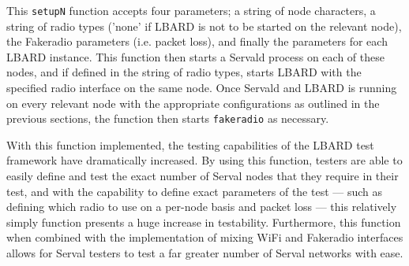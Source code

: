 This \verb|setupN| function accepts four parameters; a string of node characters, a string of radio types ('none' if LBARD is not to be started on the relevant node), the Fakeradio parameters (i.e. packet loss), and finally the parameters for each LBARD instance.
This function then starts a Servald process on each of these nodes, and if defined in the string of radio types, starts LBARD with the specified radio interface on the same node.
Once Servald and LBARD is running on every relevant node with the appropriate configurations as outlined in the previous sections, the function then starts \verb|fakeradio| as necessary.

With this function implemented, the testing capabilities of the LBARD test framework have dramatically increased.
By using this function, testers are able to easily define and test the exact number of Serval nodes that they require in their test, and with the capability to define exact parameters of the test — such as defining which radio to use on a per-node basis and packet loss — this relatively simply function presents a huge increase in testability.
Furthermore, this function when combined with the implementation of mixing WiFi and Fakeradio interfaces allows for Serval testers to test a far greater number of Serval networks with ease.


